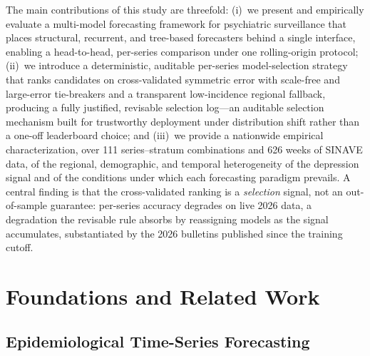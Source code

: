 \documentclass[runningheads]{llncs}
\begin{document}
The main contributions of this study are threefold: (i)~we present
and empirically evaluate a multi-model forecasting framework for
psychiatric surveillance that places structural, recurrent, and
tree-based forecasters behind a single interface, enabling a
head-to-head, per-series comparison under one rolling-origin protocol; (ii)~we
introduce a deterministic, auditable per-series model-selection
strategy that ranks candidates on cross-validated symmetric error with
scale-free and large-error tie-breakers and a transparent low-incidence
regional fallback, producing a fully justified, revisable selection
log---an auditable selection mechanism built for trustworthy deployment
under distribution shift rather than a one-off leaderboard choice; and (iii)~we provide a nationwide empirical
characterization, over 111 series--stratum combinations and 626 weeks of
SINAVE data, of the regional, demographic, and temporal
heterogeneity of the depression signal and of the conditions under which
each forecasting paradigm prevails. A central finding is that the cross-validated ranking is a
\emph{selection} signal, not an out-of-sample guarantee: per-series
accuracy degrades on live 2026 data, a degradation the revisable
rule absorbs by reassigning models as the signal accumulates,
substantiated by the 2026 bulletins published since the training cutoff.

\section{Foundations and Related Work}
\label{sec:related}

\subsection{Epidemiological Time-Series Forecasting}
\end{document}
